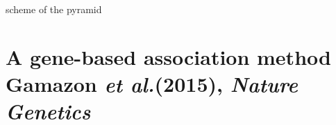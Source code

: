 \documentclass[aspectratio=169,12pt]{beamer}
\newcommand{\etal}{\textit{et al.}\xspace}
\begin{document}
\begin{frame}

	scheme of the pyramid

\end{frame}

\section{A gene-based association method \newline
\scriptsize Gamazon \etal (2015), \textit{Nature Genetics}}





\end{document}
